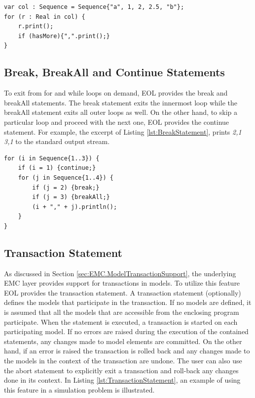 \begin{lstlisting}[basicstyle=\ttfamily\footnotesize, flexiblecolumns=true, numbers=none, nolol=true, caption=Example of a for statement, label=lst:ForStatement, numbers=left, language=EOL, tabsize=2]
var col : Sequence = Sequence{"a", 1, 2, 2.5, "b"};
for (r : Real in col) {
	r.print();
	if (hasMore){",".print();}
}
\end{lstlisting}

\subsection{Break, BreakAll and Continue Statements}

To exit from for and while loops on demand, EOL provides the break and breakAll statements. The break statement exits the innermost loop while the breakAll statement exits all outer loops as well. On the other hand, to skip a particular loop and proceed with the next one, EOL provides the continue statement. For example, the excerpt of Listing \ref{lst:BreakStatement}, prints \textit{2,1 3,1} to the standard output stream.

\begin{lstlisting}[basicstyle=\ttfamily\footnotesize, flexiblecolumns=true, numbers=none, nolol=true, caption=Example of the break\, breakAll and continue statements, label=lst:BreakStatement, numbers=left, language=EOL, tabsize=2]
for (i in Sequence{1..3}) {
	if (i = 1) {continue;}
	for (j in Sequence{1..4}) {
		if (j = 2) {break;}
		if (j = 3) {breakAll;}
		(i + "," + j).println();
	}
}
\end{lstlisting}

\subsection{Transaction Statement}

As discussed in Section \ref{sec:EMC.ModelTransactionSupport}, the underlying EMC layer provides support for transactions in models. To utilize this feature EOL provides the transaction statement. A transaction statement (optionally) defines the models that participate in the transaction. If no models are defined, it is assumed that all the models that are accessible from the enclosing program participate. When the statement is executed, a transaction is started on each participating model. If no errors are raised during the execution of the contained statements, any changes made to model elements are committed. On the other hand, if an error is raised the transaction is rolled back and any changes made to the models in the context of the transaction are undone. The user can also use the abort statement to explicitly exit a transaction and roll-back any changes done in its context. In Listing \ref{lst:TransactionStatement}, an example of using this feature in a simulation problem is illustrated.

